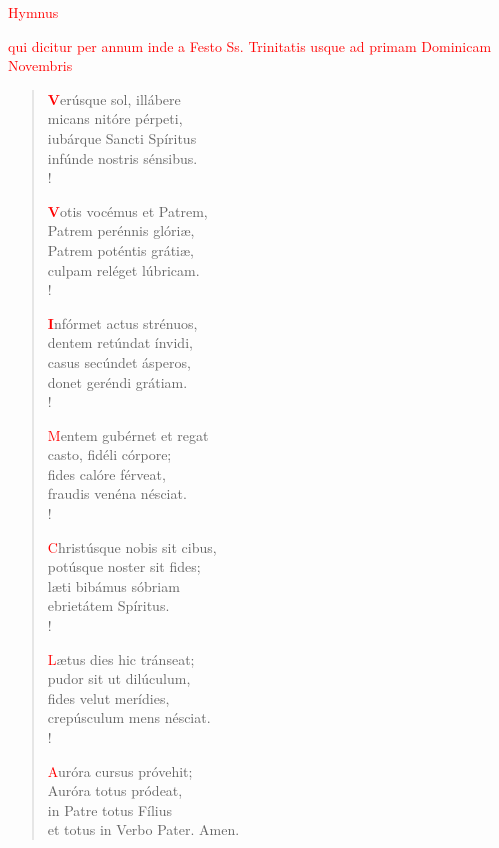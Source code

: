 
\begin{center}
 \textcolor{red}{Hymnus}
\end{center}
\settowidth{\versewidth}{inebriabuntur ab ubertate domus tuae, * 123}
\noindent\textcolor{red}{qui dicitur per annum inde a Festo Ss. Trinitatis usque ad primam Dominicam Novembris}\\

\vspace{0.3cm}

\begin{verse}
\textcolor{red}{\bf V}erúsque sol, illábere\\
micans nitóre pérpeti, \\
iubárque Sancti Spíritus\\
infúnde nostris sénsibus.\\!

\textcolor{red}{\bf V}otis vocémus et Patrem,\\
Patrem perénnis glóriæ, \\
Patrem poténtis grátiæ,\\
culpam reléget lúbricam.\\!

\textcolor{red}{\bf I}nfórmet actus strénuos, \\
dentem retúndat ínvidi, \\
casus secúndet ásperos,\\
donet geréndi grátiam.\\!

\textcolor{red}{M}entem gubérnet et regat \\
casto, fidéli córpore; \\
fides calóre férveat,\\
fraudis venéna nésciat.\\!

\textcolor{red}{C}hristúsque nobis sit cibus, \\
potúsque noster sit fides; \\
læti bibámus sóbriam\\
ebrietátem Spíritus.\\!

\textcolor{red}{L}ætus dies hic tránseat; \\
pudor sit ut dilúculum, \\
fides velut merídies,\\
crepúsculum mens nésciat.\\!

\textcolor{red}{A}uróra cursus próvehit; \\
Auróra totus pródeat,\\
in Patre totus Fílius\\
et totus in Verbo Pater. Amen.\\

      \end{verse}

